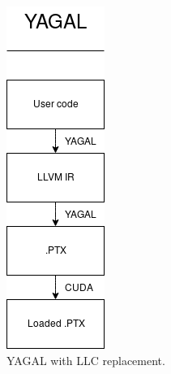\begin{figure}
\begin{minipage}[t]{0.3\textwidth}
        \includegraphics[width=\textwidth - 44pt]{chapters/implementation/figs/YAGALLLC.png} 
        \caption{YAGAL with LLC replacement.}
        \label{fig:noLLC}
    \end{minipage}
\end{figure}

